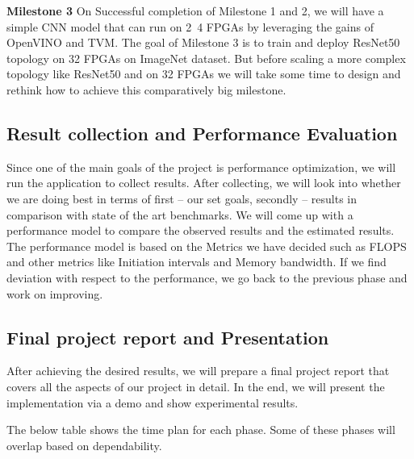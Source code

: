 \documentclass[titlepage]{report}
\begin{document}
\textbf{Milestone 3} On Successful completion of Milestone 1 and 2, we will have a simple CNN model that can run on 2~4 FPGAs by leveraging the gains of OpenVINO and TVM. The goal of Milestone 3 is to train and deploy ResNet50 topology on 32 FPGAs on ImageNet dataset. But before scaling a more complex topology like ResNet50 and on 32 FPGAs we will take some time to design and rethink how to achieve this comparatively big milestone.


\subsection{Result collection and Performance Evaluation}
Since one of the main goals of the project is performance optimization, we will run the application to collect results. After collecting, we will look into whether we are doing best in terms of first – our set goals, secondly – results in comparison with state of the art benchmarks. We will come up with a performance model to compare the observed results and the estimated results. The performance model is based on the Metrics we have decided such as FLOPS and other metrics like Initiation intervals and Memory bandwidth. If we find deviation with respect to the performance, we go back to the previous phase and work on improving.

\subsection{Final project report and Presentation}
After achieving the desired results, we will prepare a final project report that covers all the aspects of our project in detail. In the end, we will present the implementation via a demo and show experimental results. 

The below table shows the time plan for each phase. Some of these phases will overlap based on dependability.
\end{document}
